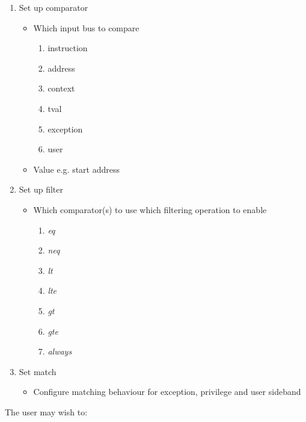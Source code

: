 \begin{enumerate}
    \item Set up comparator 
    \begin{itemize}
      \item Which input bus to compare
        \begin {enumerate}
          \item instruction
          \item address
          \item context
          \item tval
          \item exception
          \item user
        \end{enumerate}
      \item Value e.g. start address
    \end{itemize}
    \item Set up filter 
    \begin{itemize}
      \item Which comparator(s) to use which filtering operation to enable
        \begin {enumerate}
          \item \textit {eq}
          \item \textit {neq}
          \item \textit {lt}
          \item \textit {lte}
          \item \textit {gt}
          \item \textit {gte}
          \item \textit {always}
          \end{enumerate}
    \end{itemize}
    \item Set match 
    \begin{itemize}
      \item Configure matching behaviour for exception, privilege and user sideband
    \end{itemize}
\end{enumerate}

The user may wish to:

